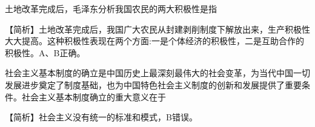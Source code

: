 \question 土地改革完成后，毛泽东分析我国农民的两大积极性是指
\par{}
\begin{solution}【简析】土地改革完成后，我国广大农民从封建剥削制度下解放出来，生产积极性大大提高。这种积极性表现在两个方面:一是个体经济的积极性，二是互助合作的积极性。A、B正确。
\end{solution}
\question 社会主义基本制度的确立是中国历史上最深刻最伟大的社会变革，为当代中国一切发展进步奠定了制度基础，也为中国特色社会主义制度的创新和发展提供了重要条件。社会主义基本制度确立的重大意义在于
\par{}
\begin{solution}【简析】社会主义没有统一的标准和模式，B错误。
\end{solution}
